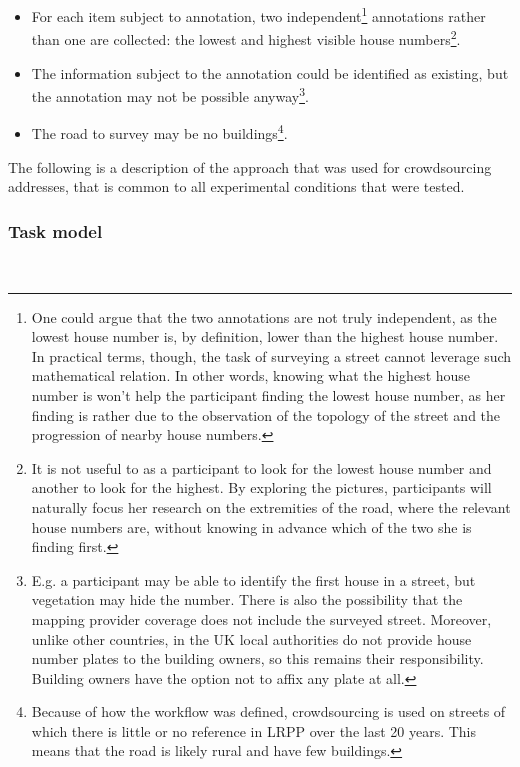 \begin{itemize}
        
    \item For each item subject to annotation, two independent\footnote{One could argue that the two annotations are not truly independent, as the lowest house number is, by definition, lower than the highest house number. In practical terms, though, the task of surveying a street cannot leverage such mathematical relation. In other words, knowing what the highest house number is won't help the participant finding the lowest house number, as her finding is rather due to the observation of the topology of the street and the progression of nearby house numbers.} annotations rather than one are collected: the lowest and highest visible house numbers\footnote{It is not useful to as a participant to look for the lowest house number and another to look for the highest. By exploring the pictures, participants will naturally focus her research on the extremities of the road, where the relevant house numbers are, without knowing in advance which of the two she is finding first.}.
        
    \item The information subject to the annotation could be identified as existing, but the annotation may not be possible anyway\footnote{E.g. a participant may be able to identify the first house in a street, but vegetation may hide the number. There is also the possibility that the mapping provider coverage does not include the surveyed street. Moreover, unlike other countries, in the UK local authorities do not provide house number plates to the building owners, so this remains their responsibility. Building owners have the option not to affix any plate at all.}.
        
    \item The road to survey may be no buildings\footnote{Because of how the workflow was defined, crowdsourcing is used on streets of which there is little or no reference in LRPP over the last 20 years. This means that the road is likely rural and have few buildings.}.
        
\end{itemize}

The following is a description of the approach that was used for crowdsourcing addresses, that is common to all experimental conditions that were tested.

\subsubsection{Task model} \leavevmode \\ %

